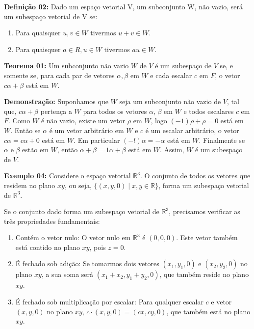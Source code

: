 \noindent\textbf{Definição 02:} Dado um espaço vetorial V, um subconjunto W, não vazio, será um subespaço vetorial de V se:
\begin{enumerate}
	\item Para quaisquer $u, v \in W$ tivermos $u + v \in W$.
	\item Para quaisquer $a \in R, u \in W$ tivermos $au \in W$.
	\end{enumerate}

\noindent\textbf{Teorema 01:} Um subconjunto não vazio $W$ de $V$ é um subespaço de $V$ se, e somente se, para cada par de vetores $\alpha, \beta$ em $W$ e cada escalar $c$ em $F$, o vetor $c\alpha + \beta$ está em $W$.

\noindent\textbf{Demonstração:} Suponhamos que $W$ seja um subconjunto não vazio de $V$, tal que, $c\alpha + \beta$ pertença a $W$ para todos os vetores $\alpha$, $\beta$ em $W$ e todos escalares $c$ em $F$. Como $W$ é não vazio, existe um vetor $\rho$ em $W$, logo $(-1) \rho + \rho = 0$ está em $W$. Então se $\alpha$ é um vetor arbitrário em $W$ e $c$ é um escalar arbitrário, o vetor $c\alpha = c\alpha + 0$ está em $W$. Em particular $(-l)\alpha = -\alpha$ está em $W$. Finalmente se $\alpha$ e $\beta$ estão em $W$, então $\alpha + \beta = 1\alpha + \beta$ está em $W$.
Assim, $W$ é um subespaço de $V$. \nocite{hoffman1979}

\noindent\textbf{Exemplo 04:} Considere o espaço vetorial $\mathbb{R}^3$. O conjunto de todos os vetores que residem no plano $xy$, ou seja, $\{(x, y, 0) \mid x, y \in \mathbb{R}\}$, forma um subespaço vetorial de $\mathbb{R}^3$.

Se o conjunto dado forma um subespaço vetorial de $\mathbb{R}^3$, precisamos verificar as três propriedades fundamentais:

\begin{enumerate}
    \item Contém o vetor nulo: O vetor nulo em $\mathbb{R}^3$ é $(0,0,0)$. Este vetor também está contido no plano $xy$, pois $z = 0$.
    
    \item É fechado sob adição: Se tomarmos dois vetores $(x_1, y_1, 0)$ e $(x_2, y_2, 0)$ no plano $xy$, a sua soma será $(x_1 + x_2, y_1 + y_2, 0)$, que também reside no plano $xy$.
    
    \item É fechado sob multiplicação por escalar: Para qualquer escalar $c$ e vetor $(x, y, 0)$ no plano $xy$, $c \cdot (x, y, 0) = (cx, cy, 0)$, que também está no plano $xy$.
\end{enumerate}

